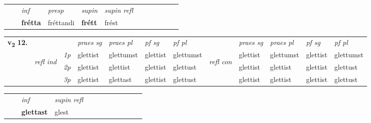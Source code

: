 \begin{tabular}{llllllllllll}
 & & \textit{inf}     & \textit{presp} & \textit{supin} & \textit{supin refl}      \\*
  & & \textbf{frétta}      & fréttandi &  \textbf{frétt} & frést  \\*
\cmidrule{1-12}
\end{tabular}



\begin{tabular}{llllllllllll} \toprule
\multirow{4}{*}{{{\textbf{v{\textsubscript{2}}} \Large{\textbf{12.}}}}}  & &   &  \textit{praes sg}  & \textit{praes pl}  &\textit{pf sg} & \textit{pf pl} &  &  \textit{praes sg}  & \textit{praes pl}  & \textit{pf sg} & \textit{pf pl } \\*
	\cmidrule{4-7} \cmidrule{9-12}
 &\multirow{3}{*}{\begin{turn}{90}\textit{refl ind}\end{turn}} & {\textit{1p}} & glettist & glettumst    & glettist & glettumst & \multirow{3}{*}{\begin{turn}{90}\textit{refl con}\end{turn}}  &glettist & glettumst & glettist & glettumst\\*
 &&  {\textit{2p}} &  glettist  & glettist   & glettist & glettust & &glettist & glettist & glettist & glettust \\*
& &  {\textit{3p}} & glettist & glettast   & glettist & glettust & & glettist & glettist& glettist & glettust  \\*
\cmidrule{4-7} \cmidrule{9-12}
\end{tabular}


\begin{tabular}{llllllllllll}
 & & \textit{inf}       & \textit{supin refl}      \\*
  & & \textbf{glettast}        & glest  \\*
\cmidrule{1-12}
\end{tabular}



